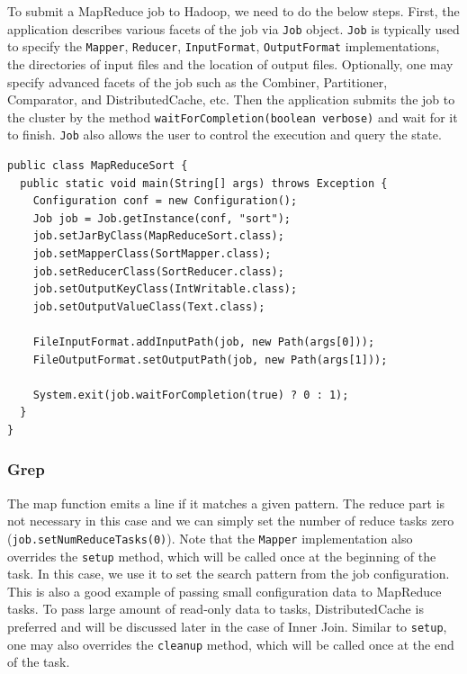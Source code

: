\documentclass[12pt]{book}
\begin{document}
To submit a MapReduce job to Hadoop, we need to do the below steps. First, the application describes various facets of the job via \texttt{Job} object. \texttt{Job} is typically used to specify the \texttt{Mapper}, \texttt{Reducer}, \texttt{InputFormat}, \texttt{OutputFormat} implementations, the directories of input files and the location of output files.
Optionally, one may specify advanced facets of the job such as the Combiner, Partitioner, Comparator, and DistributedCache, etc. Then the application submits the job to the cluster by the method \texttt{waitForCompletion(boolean verbose)}  and wait for it to finish.
\texttt{Job} also allows the user to control the execution and query the state.
\begin{lstlisting}
public class MapReduceSort {
  public static void main(String[] args) throws Exception {
    Configuration conf = new Configuration();
    Job job = Job.getInstance(conf, "sort");
    job.setJarByClass(MapReduceSort.class);
    job.setMapperClass(SortMapper.class);
    job.setReducerClass(SortReducer.class);
    job.setOutputKeyClass(IntWritable.class);
    job.setOutputValueClass(Text.class);

    FileInputFormat.addInputPath(job, new Path(args[0]));
    FileOutputFormat.setOutputPath(job, new Path(args[1]));

    System.exit(job.waitForCompletion(true) ? 0 : 1);
  }
}
\end{lstlisting}
\subsubsection{Grep}

The map function emits a line if it matches a given pattern. The reduce part is not necessary in this case and we can simply set the number of reduce tasks zero (\texttt{job.setNumReduceTasks(0)}). Note that the \texttt{Mapper} implementation also overrides the \texttt{setup} method, which will be called once at the beginning of the task. In this case, we use it to set the search pattern from the job configuration. This is also a good example of passing small configuration data to MapReduce tasks. To pass large amount of read-only data to tasks, DistributedCache is preferred and will be discussed later in the case of Inner Join. Similar to \texttt{setup}, one may also overrides the \texttt{cleanup} method, which will be called once at the end of the task.
\end{document}
